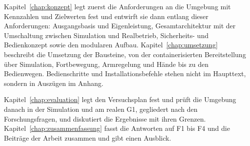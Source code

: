 Kapitel~\ref{chap:konzept} legt zuerst die Anforderungen an die Umgebung mit Kennzahlen und Zielwerten fest und entwirft sie dann entlang dieser Anforderungen: Ausgangsbasis und Eigenleistung, Gesamtarchitektur mit der Umschaltung zwischen Simulation und Realbetrieb, Sicherheits- und Bedienkonzept sowie den modularen Aufbau.
Kapitel~\ref{chap:umsetzung} beschreibt die Umsetzung der Bausteine, von der containerisierten Bereitstellung über Simulation, Fortbewegung, Armregelung und Hände bis zu den Bedienwegen.
Bedienschritte und Installationsbefehle stehen nicht im Haupttext, sondern in Auszügen im Anhang.

Kapitel~\ref{chap:evaluation} legt den Versuchsplan fest und prüft die Umgebung danach in der Simulation und am realen G1, gegliedert nach den Forschungsfragen, und diskutiert die Ergebnisse mit ihren Grenzen.
Kapitel~\ref{chap:zusammenfassung} fasst die Antworten auf F1 bis F4 und die Beiträge der Arbeit zusammen und gibt einen Ausblick.

